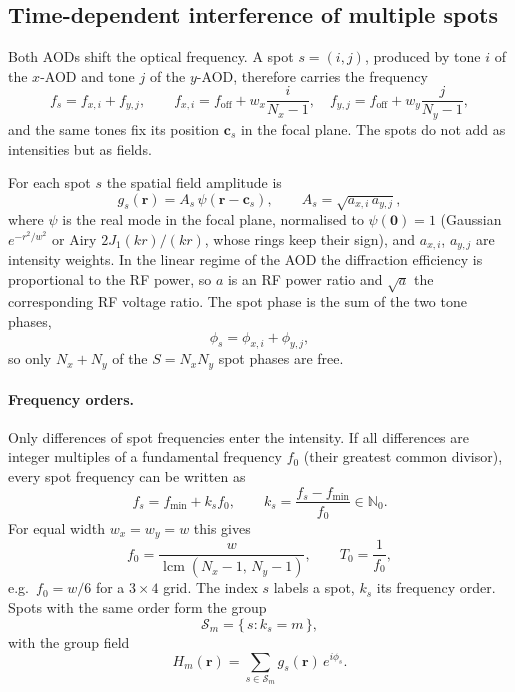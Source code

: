 \subsection{Time-dependent interference of multiple spots}

Both AODs shift the optical frequency. A spot $s=(i,j)$, produced by tone $i$
of the $x$-AOD and tone $j$ of the $y$-AOD, therefore carries the frequency
\begin{equation}
f_s = f_{x,i}+f_{y,j},
\qquad
f_{x,i}=f_\mathrm{off}+w_x\frac{i}{N_x-1},\quad
f_{y,j}=f_\mathrm{off}+w_y\frac{j}{N_y-1},
\end{equation}
and the same tones fix its position $\mathbf c_s$ in the focal plane. The
spots do not add as intensities but as fields.

For each spot $s$ the spatial field amplitude is
\begin{equation}
g_s(\mathbf r) = A_s\,\psi(\mathbf r-\mathbf c_s),
\qquad
A_s=\sqrt{a_{x,i}\,a_{y,j}},
\end{equation}
where $\psi$ is the real mode in the focal plane, normalised to
$\psi(\mathbf 0)=1$ (Gaussian $e^{-r^2/w^2}$ or Airy $2J_1(kr)/(kr)$, whose
rings keep their sign), and $a_{x,i}$, $a_{y,j}$ are intensity weights. In the
linear regime of the AOD the diffraction efficiency is proportional to the RF
power, so $a$ is an RF power ratio and $\sqrt a$ the corresponding RF voltage
ratio. The spot phase is the sum of the two tone phases,
\begin{equation}
\phi_s=\phi_{x,i}+\phi_{y,j},
\end{equation}
so only $N_x+N_y$ of the $S=N_xN_y$ spot phases are free.

\paragraph{Frequency orders.}
Only differences of spot frequencies enter the intensity. If all differences
are integer multiples of a fundamental frequency $f_0$ (their greatest common
divisor), every spot frequency can be written as
\begin{equation}
f_s=f_{\min}+k_s f_0,
\qquad
k_s=\frac{f_s-f_{\min}}{f_0}\in\mathbb N_0 .
\end{equation}
For equal width $w_x=w_y=w$ this gives
\begin{equation}
f_0=\frac{w}{\operatorname{lcm}(N_x-1,\,N_y-1)},
\qquad
T_0=\frac{1}{f_0},
\end{equation}
e.g.\ $f_0=w/6$ for a $3\times4$ grid. The index $s$ labels a spot, $k_s$ its
frequency order. Spots with the same order form the group
\begin{equation}
\mathcal S_m=\{\,s : k_s=m\,\},
\end{equation}
with the group field
\begin{equation}
H_m(\mathbf r)=\sum_{s\in\mathcal S_m} g_s(\mathbf r)\,e^{i\phi_s}.
\end{equation}


